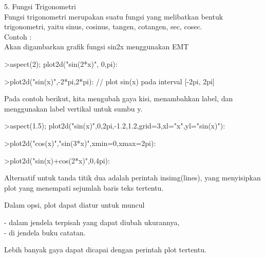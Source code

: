 \documentclass{article}
\begin{document}
\begin{eulernotebook}
\begin{eulercomment}
\begin{eulercomment}
\begin{eulercomment}
\begin{eulercomment}
\begin{eulercomment}
\begin{eulercomment}
\begin{eulercomment}
\end{eulercomment}
\eulersubheading{}
\begin{eulercomment}
5. Fungsi Trigonometri\\
Fungsi trigonometri merupakan suatu fungsi yang melibatkan bentuk
trigonometri, yaitu sinus, cosinus, tangen, cotangen, sec, cosec.\\
Contoh :\\
Akan digambarkan grafik fungsi sin2x menggunakan EMT
\end{eulercomment}
\begin{eulerprompt}
>aspect(2); plot2d("sin(2*x)", 0,pi):
\end{eulerprompt}
\begin{eulerprompt}
>plot2d("sin(x)",-2*pi,2*pi): // plot sin(x) pada interval [-2pi, 2pi]
\end{eulerprompt}
\begin{eulercomment}
Pada contoh berikut, kita mengubah gaya kisi, menambahkan label, dan
menggunakan label vertikal untuk sumbu y.
\end{eulercomment}
\begin{eulerprompt}
>aspect(1.5); plot2d("sin(x)",0,2pi,-1.2,1.2,grid=3,xl="x",yl="sin(x)"):
\end{eulerprompt}
\begin{eulerprompt}
>plot2d("cos(x)","sin(3*x)",xmin=0,xmax=2pi):
\end{eulerprompt}
\begin{eulerprompt}
>plot2d("sin(x)+cos(2*x)",0,4pi):
\end{eulerprompt}
\begin{eulercomment}
Alternatif untuk tanda titik dua adalah perintah insimg(lines), yang
menyisipkan plot yang menempati sejumlah baris teks tertentu.

Dalam opsi, plot dapat diatur untuk muncul

- dalam jendela terpisah yang dapat diubah ukurannya,\\
- di jendela buku catatan.

Lebih banyak gaya dapat dicapai dengan perintah plot tertentu.


\end{eulercomment}
\end{eulercomment}
\end{eulercomment}
\end{eulercomment}
\end{eulercomment}
\end{eulercomment}
\end{eulercomment}
\end{eulernotebook}
\end{document}
